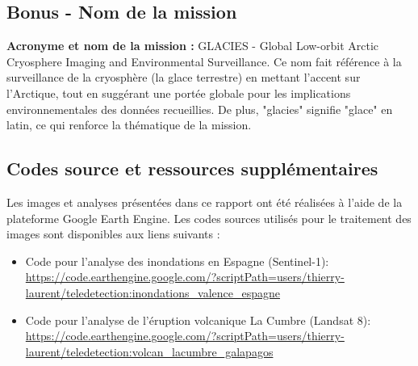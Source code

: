 \documentclass[12pt,a4paper]{article}
\begin{document}
\subsection{Bonus - Nom de la mission}
\textbf{Acronyme et nom de la mission :}
GLACIES - Global Low-orbit Arctic Cryosphere Imaging and Environmental Surveillance. Ce nom fait référence à la surveillance de la cryosphère (la glace terrestre) en mettant l'accent sur l'Arctique, tout en suggérant une portée globale pour les implications environnementales des données recueillies. De plus, "glacies" signifie "glace" en latin, ce qui renforce la thématique de la mission.

\newpage



\newpage
\subsection*{Codes source et ressources supplémentaires}

Les images et analyses présentées dans ce rapport ont été réalisées à l'aide de la plateforme Google Earth Engine. Les codes sources utilisés pour le traitement des images sont disponibles aux liens suivants :

\begin{itemize}
    \item Code pour l'analyse des inondations en Espagne (Sentinel-1): 
    \url{https://code.earthengine.google.com/?scriptPath=users/thierry-laurent/teledetection:inondations_valence_espagne}
    
    \item Code pour l'analyse de l'éruption volcanique La Cumbre (Landsat 8): 
    \url{https://code.earthengine.google.com/?scriptPath=users/thierry-laurent/teledetection:volcan_lacumbre_galapagos}
\end{itemize}
\end{document}
